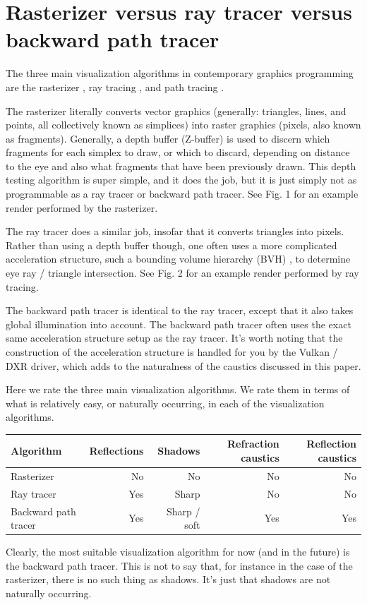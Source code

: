 \documentclass[12pt]{article}
\begin{document}
\section{Rasterizer versus ray tracer versus backward path tracer}

The three main visualization algorithms in contemporary graphics programming are the rasterizer \cite{noll, wikipedia1}, ray tracing \cite{appel, wikipedia2}, and path tracing \cite{kajiya, wikipedia3}.

The rasterizer literally converts vector graphics (generally: triangles, lines, and points, all collectively known as simplices) into raster graphics (pixels, also known as fragments).
Generally, a depth buffer (Z-buffer) \cite{wikipedia4} is used to discern which fragments for each simplex to draw, or which to discard, depending on distance to the eye and also what fragments that have been previously drawn.
This depth testing algorithm is super simple, and it does the job, but it is just simply not as programmable as a ray tracer or backward path tracer.
See Fig. 1 for an example render performed by the rasterizer.

The ray tracer does a similar job, insofar that it converts triangles into pixels.
Rather than using a depth buffer though, one often uses a more complicated acceleration structure, such a bounding volume hierarchy (BVH) \cite{wikipedia5}, to determine eye ray / triangle intersection.
See Fig. 2 for an example render performed by ray tracing.

The backward path tracer is identical to the ray tracer, except that it also takes global illumination into account.
The backward path tracer often uses the exact same acceleration structure setup as the ray tracer.
It's worth noting that the construction of the acceleration structure is handled for you by the Vulkan / DXR driver, which adds to the naturalness of the caustics discussed in this paper.

Here we rate the three main visualization algorithms.
We rate them in terms of what is relatively easy, or naturally occurring, in each of the visualization algorithms.
\begin{center}
\begin{tabular}{| l | r | r | r | r |}
  \hline
 Algorithm &  Reflections & Shadows & Refraction caustics & Reflection caustics \\
\hline
\hline
Rasterizer & No & No & No &  No \\
Ray tracer & Yes & Sharp & No & No  \\
Backward path tracer & Yes & Sharp / soft & Yes & Yes \\
  \hline  
\end{tabular}
\end{center}
Clearly, the most suitable visualization algorithm for now (and in the future) is the backward path tracer.
This is not to say that, for instance in the case of the rasterizer, there is no such thing as shadows.
It's just that shadows are not naturally occurring.
\end{document}
